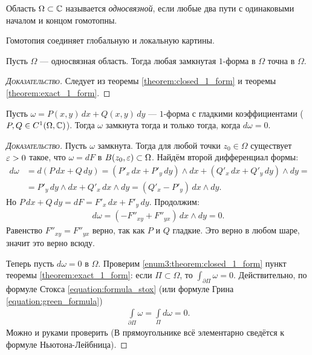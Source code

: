 \documentclass[../complex-analysis.tex]{subfiles}
\begin{document}
\begin{df}
 Область $\Omega \subset \mathbb{C}$ называется \textit{односвязной}, если любые два пути с одинаковыми началом и концом гомотопны.
\end{df}

Гомотопия соединяет глобальную и локальную картины.

\begin{crly}
 Пусть $\Omega$ --- односвязная область. Тогда любая замкнутая $1$-форма в $\Omega$ точна в $\Omega$.
\end{crly}
\begin{proof}[\normalfont\textsc{Доказательство}]
 Следует из теоремы \ref{theorem:closed_1_form} и теоремы \ref{theorem:exact_1_form}.
\end{proof}

\begin{thm}
 Пусть $\omega = P(x,y)\,dx + Q(x,y)\,dy$ --- $1$-форма с гладкими коэффициентами ($P, Q \in C^{1}(\Omega, \mathbb{C})$). Тогда $\omega$ замкнута тогда и только тогда, когда $d \omega = 0$.
\end{thm}
\begin{proof}[\normalfont\textsc{Доказательство}]
 Пусть $\omega$ замкнута. Тогда для любой точки $z_0 \in \Omega$  существует $\varepsilon > 0$ такое, что $\omega = dF$ в $B(z_0, \varepsilon) \subset \Omega$. Найдём второй дифференциал формы:
 \begin{align*}
  d \omega &= d(P\,dx + Q\,dy) = (P'_x \, dx + P'_y\,dy) \land dx + (Q'_x \, dx + Q'_y \, dy) \land dy = \\
  &= P'_y \, dy \land dx + Q'_x \, dx \land dy = (Q'_x - P'_y) \, dx \land dy.
 \end{align*} Но $P\,dx + Q \, dy = dF = F'_x \, dx + F'_y \, dy$. Продолжим:
 \begin{align*}
  d \omega = (-F''_{xy} + F''_{yx})\,dx \land dy = 0
 .\end{align*} Равенство $F''_{xy} = F''_{yx}$ верно, так как $P$ и $Q$ гладкие. Это верно в любом шаре, значит это верно всюду.


 Теперь пусть $d \omega = 0$ в $\Omega$. Проверим \ref{enum3:theorem:closed_1_form} пункт теоремы \ref{theorem:exact_1_form}: если $\Pi \subset \Omega$, то $\int_{\partial\Pi} \omega = 0 $. Действительно, по формуле Стокса \eqref{equation:formula_stox} (или формуле Грина \eqref{equation:green_formula})
 \begin{align*}
  \int\limits_{\partial\Pi} \omega = \int\limits_{\Pi} d\omega = 0.  
 \end{align*} Можно и руками проверить (В прямоугольнике всё элементарно сведётся к формуле Ньютона-Лейбница).
\end{proof}
\end{document}
